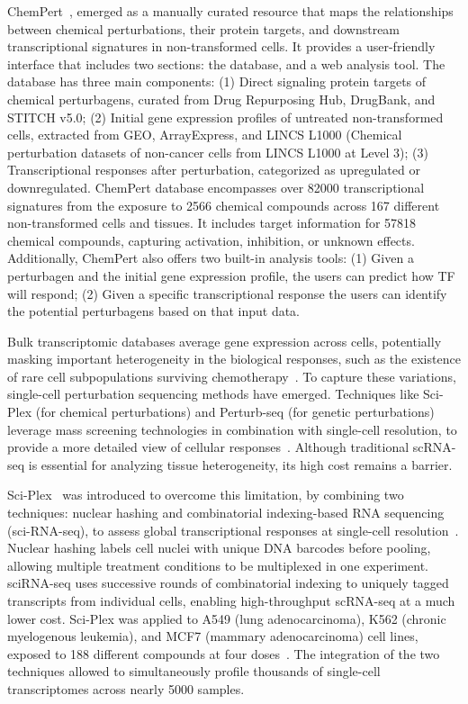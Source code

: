 ChemPert~\cite{RN86}, emerged as a manually curated resource that maps the relationships between chemical perturbations, their protein targets, and downstream transcriptional signatures in non-transformed cells. 
It provides a user-friendly interface that includes two sections: the database, and a web analysis tool. The database has three main components: 
(1) Direct signaling protein targets of chemical perturbagens, curated from Drug Repurposing Hub, DrugBank, and STITCH v5.0; 
(2) Initial gene expression profiles of untreated non-transformed cells, extracted from GEO, ArrayExpress, and LINCS L1000 (Chemical perturbation datasets of non-cancer cells from LINCS L1000 at Level 3); 
(3) Transcriptional responses after perturbation, categorized as upregulated or downregulated. 
ChemPert database encompasses over 82000 transcriptional signatures from the exposure to 2566 chemical compounds across 167 different non-transformed cells and tissues. 
It includes target information for 57818 chemical compounds, capturing activation, inhibition, or unknown effects. 
Additionally, ChemPert also offers two built-in analysis tools: 
(1) Given a perturbagen and the initial gene expression profile, the users can predict how \gls{TF} will respond; 
(2) Given a specific transcriptional response the users can identify the potential perturbagens based on that input data.


Bulk transcriptomic databases average gene expression across cells, potentially masking important heterogeneity in the biological responses, such as the existence of rare cell subpopulations surviving chemotherapy~\cite{RN88}. To capture these variations, single-cell perturbation sequencing methods have emerged. 
Techniques like Sci-Plex (for chemical perturbations) and Perturb-seq (for genetic perturbations) leverage mass screening technologies in combination with single-cell resolution, to provide a more detailed view of cellular responses~\cite{RN97}. 
Although traditional \gls{scRNA-seq} is essential for analyzing tissue heterogeneity, its high cost remains a barrier. 

Sci-Plex~\cite{RN88} was introduced to overcome this limitation, by combining two techniques: nuclear hashing and combinatorial indexing-based RNA sequencing (sci-RNA-seq), to assess global transcriptional responses at single-cell resolution~\cite{RN125, RN126}. Nuclear hashing labels cell nuclei with unique \gls{DNA} barcodes before pooling, allowing multiple treatment conditions to be multiplexed in one experiment. sciRNA-seq uses successive rounds of combinatorial indexing to uniquely tagged transcripts from individual cells, enabling high-throughput \gls{scRNA-seq} at a much lower cost.
Sci-Plex was applied to A549 (lung adenocarcinoma), K562 (chronic myelogenous leukemia), and MCF7 (mammary adenocarcinoma) cell lines, exposed to 188 different compounds at four doses~\cite{RN88}. The integration of the two techniques allowed to simultaneously profile thousands of single-cell transcriptomes across nearly 5000 samples. 

